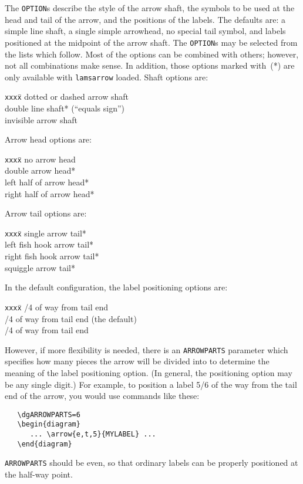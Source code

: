 The \verb"OPTION"s describe the style of the arrow shaft, the symbols 
to be used at the head and tail of the arrow, and the positions of 
the labels.  The defaults are: a simple line shaft, a single simple 
arrowhead, no special tail symbol, and labels positioned at the 
midpoint of the arrow shaft.  The \verb"OPTION"s may be selected from 
the lists which follow.  Most of the options can be combined with 
others; however, not all combinations make sense.  In addition,
those options marked with~(*) are only available with 
\verb"lamsarrow" loaded.
Shaft options are:
\begin{tabbing}
   {\tt xxx}\={\tt x}\qquad\=\kill
   \>  dotted or dashed arrow shaft\\
   \>{\tt =}\>  double line shaft* (``equals sign'')\\
   \>{\tt !}\>  invisible arrow shaft
\end{tabbing}
Arrow head options are:
\begin{tabbing}
   {\tt xxx}\={\tt x}\qquad\=\kill
   \>{\tt -}\>  no arrow head\\
   \>  double arrow head*\\
   \>  left half of arrow head*\\
   \>  right half of arrow head*
\end{tabbing}
Arrow tail options are:
\begin{tabbing}
   {\tt xxx}\={\tt x}\qquad\=\kill
   \>  single arrow tail*\\
   \>  left fish hook arrow tail*\\
   \>  right fish hook arrow tail*\\
   \>  squiggle arrow tail*
\end{tabbing}
In the default configuration, the label positioning options are:
\begin{tabbing}
   {\tt xxx}\={\tt x}\qquad\=\kill
   /4 of way from tail end\\
   /4 of way from tail end (the default)\\
   /4 of way from tail end
\end{tabbing}
However, if more flexibility is needed, there is an
\verb"ARROWPARTS" parameter which specifies how many pieces the arrow 
will be divided into to determine the meaning of the label 
positioning option.  (In general, the positioning option may be any
single digit.)  For example, to position a label 5/6 of the way from
the tail end of the arrow, you would use commands like these:
\begin{verbatim}
   \dgARROWPARTS=6
   \begin{diagram}
      ... \arrow{e,t,5}{MYLABEL} ...
   \end{diagram}
\end{verbatim}
\verb"ARROWPARTS" should be even, so that ordinary labels can
be properly positioned at the half-way point.

